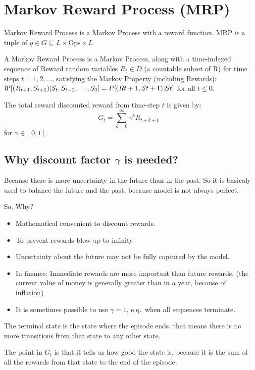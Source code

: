 \section{Markov Reward Process (MRP)}\label{sec:markov-reward-process}
Markov Reward Process is a Markov Process with a reward function.
MRP is a tuple of $g\in G\subseteq L \times \mathrm{Ops} \times L$
\begin{definition}
    A Markov Reward Process is a Markov Process, along with a time-indexed
    sequence of Reward random variables $R_t \in D$ (a countable subset of R) for time steps $t =
    1,2,\ldots$, satisfying the Markov Property (including Rewards):
    $\text{I\kern-0.15em P}[(R_{t+1}, S_{t+1})|S_t, S_{t-1}, \ldots, S_0] = P[(Rt+1, St+1)|St]$ for all $t \leq 0.$~\cite[p.~79]{rao2022foundations}
\end{definition}

The total reward discounted reward from time-step $t$ is given by:
\[
    G_t = \sum_{k=0}^{\infty} \gamma^k R_{t+k+1}
\]
for $\gamma \in [0,1]$.

\subsection{Why discount factor $\gamma$ is needed?}
Because there is more uncertainty in the future than in the past.
So it is basicaly used to balance the future and the past, because
model is not always perfect.

So, Why?
\begin{itemize}
    \item Mathematical convenient to discount rewards.
    \item To prevent rewards blow-up to infinity
    \item Uncertainty about the future may not be fully captured by the model.
    \item In finance: Immediate rewards are more important than future rewards.
    (the current value of money is generally greater than in a year, because of inflation)
    \item It is sometimes possible to use $\gamma=1$, e.q.\ when all sequences terminate.
\end{itemize}

The terminal state is the state where the episode ends, that means there
is no more transitions from that state to any other state.

The point in $G_t$ is that it tells us how good the state is, because
it is the sum of all the rewards from that state to the end of the episode. %


